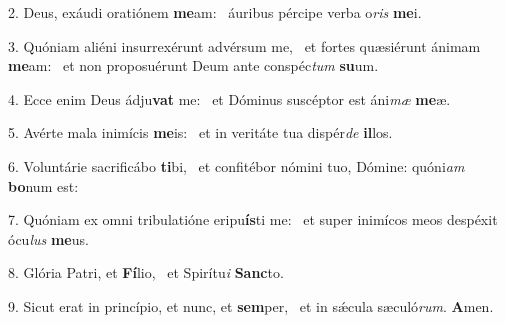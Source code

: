 2. Deus, exáudi oratiónem \textbf{me}am: \ast\  áuribus pércipe verba o\textit{ris} \textbf{me}i.\

3. Quóniam aliéni insurrexérunt advérsum me, \dag\  et fortes quæsiérunt ánimam \textbf{me}am: \ast\  et non proposuérunt Deum ante conspéc\textit{tum} \textbf{su}um.\

4. Ecce enim Deus ádju\textbf{vat} me: \ast\  et Dóminus suscéptor est áni\textit{mæ} \textbf{me}æ.\

5. Avérte mala inimícis \textbf{me}is: \ast\  et in veritáte tua dispér\textit{de} \textbf{il}los.\

6. Voluntárie sacrificábo \textbf{ti}bi, \ast\  et confitébor nómini tuo, Dómine: quóni\textit{am} \textbf{bo}num est:\

7. Quóniam ex omni tribulatióne eripu\textbf{ís}ti me: \ast\  et super inimícos meos despéxit ócu\textit{lus} \textbf{me}us.\

8. Glória Patri, et \textbf{Fí}lio, \ast\  et Spirítu\textit{i} \textbf{Sanc}to.\

9. Sicut erat in princípio, et nunc, et \textbf{sem}per, \ast\  et in sǽcula sæculó\textit{rum}. \textbf{A}men.\

